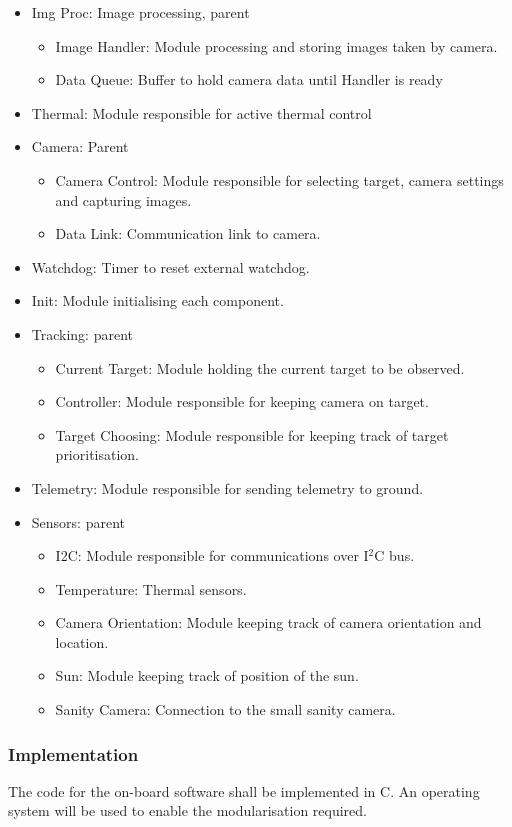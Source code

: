 \begin{itemize}
	\item Img Proc: Image processing, parent
		\begin{itemize}
			\item Image Handler: Module processing and storing images taken by camera.
			\item Data Queue: Buffer to hold camera data until Handler is ready
		\end{itemize}
	\item Thermal: Module responsible for active thermal control
	\item Camera: Parent
		\begin{itemize}
			\item Camera Control: Module responsible for selecting target, camera settings and capturing images.
			\item Data Link: Communication link to camera.
		\end{itemize}
	\item Watchdog: Timer to reset external watchdog.
	\item Init: Module initialising each component.
	\item Tracking: parent
		\begin{itemize}
			\item Current Target: Module holding the current target to be observed.
			\item Controller: Module responsible for keeping camera on target.
			\item Target Choosing: Module responsible for keeping track of target prioritisation.
		\end{itemize}
	\item Telemetry: Module responsible for sending telemetry to ground.
	\item Sensors: parent
		\begin{itemize}
			\item I2C: Module responsible for communications over I$^2$C bus.
			\item Temperature: Thermal sensors.
			\item Camera Orientation: Module keeping track of camera orientation and location.
			\item Sun: Module keeping track of position of the sun.
			\item Sanity Camera: Connection to the small sanity camera.
		\end{itemize}
		
\end{itemize}

\subsubsection{Implementation}\label{sec:4.8.3}

The code for the on-board software shall be implemented in C. An operating system will be used to enable the modularisation required.

\raggedbottom
